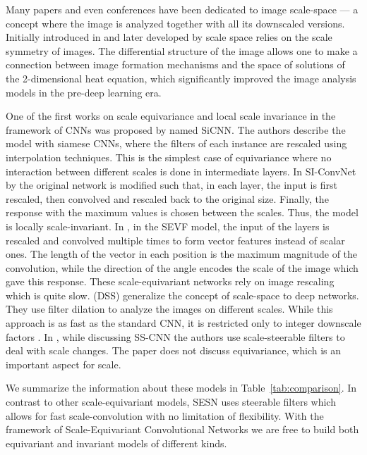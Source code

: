 \documentclass{article} \usepackage{multirow}
\def\Tabref#1{Table~\ref{#1}}
\begin{document}
Many papers and even conferences have been dedicated to image scale-space --- a concept where the image is analyzed
together with all its downscaled versions. Initially introduced in \citet{iijima1959basic} and later developed
by \citet{witkin1987scale,perona1990scale,lindeberg2013scale} scale space relies on the scale symmetry of images. 
The differential structure of the image \citet{koenderink1984structure} allows one to make a connection 
between image formation mechanisms and the space of solutions of the 2-dimensional heat equation, which 
significantly improved the image analysis models in the pre-deep learning era. 

One of the first works on scale equivariance and local scale invariance in the framework of CNNs 
was proposed by \citet{xu2014scale} named SiCNN.
The authors describe the model with siamese CNNs, where the filters of each instance are rescaled
using interpolation techniques.
This is the simplest case of equivariance where no interaction between different scales is done 
in intermediate layers. In SI-ConvNet by \citet{kanazawa2014locally} the original network is modified such that, 
in each layer, the input is first rescaled, then convolved and rescaled back to the original size. Finally, 
the response with the maximum values is chosen between the scales. Thus, the model is locally scale-invariant.
In \citet{marcos2018scale}, in the SEVF model, the input of the layers is 
rescaled and convolved multiple times to form vector features instead of scalar ones.
The length of the vector 
in each position is the maximum magnitude of the convolution, while the direction of the angle
encodes the scale of the image which gave this response. These scale-equivariant networks 
rely on image rescaling which is quite slow. \citet{worrall2019deep} (DSS) generalize the concept 
of scale-space to deep networks. They use filter dilation to analyze the images on different scales. 
While this approach is as fast as the standard CNN, it is restricted only to integer 
downscale factors .
In \citet{ghosh2019scale}, while discussing SS-CNN the authors 
use scale-steerable filters to deal with scale changes. The paper does not discuss equivariance, 
which is an important aspect for scale. 

We summarize the information about these models in \Tabref{tab:comparison}.
In contrast to other scale-equivariant models, SESN uses steerable filters which allows for 
fast scale-convolution with no limitation of flexibility. 
With the framework of Scale-Equivariant Convolutional Networks we are 
free to build both equivariant and invariant models
of different kinds. 
\end{document}
